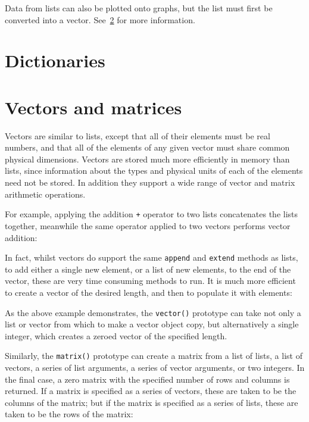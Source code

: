 Data from lists can also be plotted onto graphs, but the list must first be
converted into a vector. See~\ref{sec:vectors} for more information.

\section{Dictionaries}



\section{Vectors and matrices}
\label{sec:vectors}

Vectors are similar to lists, except that all of their elements must be real
numbers, and that all of the elements of any given vector must share common
physical dimensions.  Vectors are stored much more efficiently in memory than
lists, since information about the types and physical units of each of the
elements need not be stored. In addition they support a wide range of vector
and matrix arithmetic operations.

For example, applying the addition {\tt +} operator to two lists concatenates
the lists together, meanwhile the same operator applied to two vectors performs
vector addition:

\vspace{3mm}

\vspace{3mm}

In fact, whilst vectors do support the same {\tt append} and {\tt extend}
methods as lists, to add either a single new element, or a list of new
elements, to the end of the vector, these are very time consuming methods to
run. It is much more efficient to create a vector of the desired length, and
then to populate it with elements:

\vspace{3mm}

\vspace{3mm}

As the above example demonstrates, the {\tt vector()} prototype can take not
only a list or vector from which to make a vector object copy, but
alternatively a single integer, which creates a zeroed vector of the specified
length.

Similarly, the {\tt matrix()} prototype can create a matrix from a list of
lists, a list of vectors, a series of list arguments, a series of vector
arguments, or two integers. In the final case, a zero matrix with the specified
number of rows and columns is returned. If a matrix is specified as a series of
vectors, these are taken to be the columns of the matrix; but if the matrix is
specified as a series of lists, these are taken to be the rows of the matrix:

